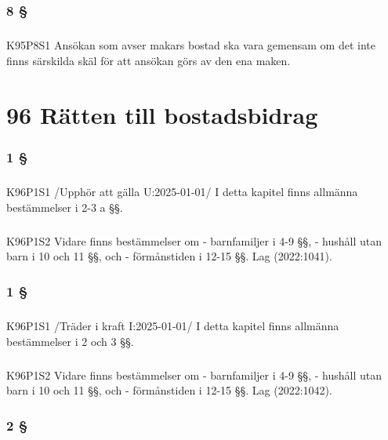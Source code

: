 \documentclass[a4paper,notitlepage,openany,10pt]{book}
\begin{document}
\subsection*{8 §}
\paragraph*{}
{\tiny K95P8S1}
Ansökan som avser makars bostad ska vara gemensam om det inte finns särskilda skäl för att ansökan görs av den ena maken.
\chapter*{96 Rätten till bostadsbidrag}
\subsection*{1 §}
\paragraph*{}
{\tiny K96P1S1}
/Upphör att gälla U:2025-01-01/
I detta kapitel finns allmänna bestämmelser i 2-3 a §§.
\paragraph*{}
{\tiny K96P1S2}
Vidare finns bestämmelser om
\newline - barnfamiljer i 4-9 §§,
\newline - hushåll utan barn i 10 och 11 §§, och
\newline - förmånstiden i 12-15 §§.
Lag (2022:1041).
\subsection*{1 §}
\paragraph*{}
{\tiny K96P1S1}
/Träder i kraft I:2025-01-01/
I detta kapitel finns allmänna bestämmelser i 2 och 3 §§.
\paragraph*{}
{\tiny K96P1S2}
Vidare finns bestämmelser om
\newline - barnfamiljer i 4-9 §§,
\newline - hushåll utan barn i 10 och 11 §§, och
\newline - förmånstiden i 12-15 §§.
Lag (2022:1042).
\subsection*{2 §}
\end{document}
